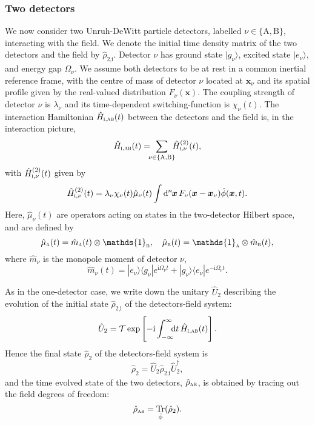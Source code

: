 \documentclass[pra,nofootinbib,floats,aps,twocolumn,tightenlines,superscriptaddress]{revtex4-1}
\DeclareMathOperator{\Tr}{Tr}
\renewcommand*\d[2][]{%
	\mathrm{d}%
	\ifx\relax#1\relax\else
	\rule{-0.02em}{1.5ex}^{#1}\rule{0.08em}{0ex}\!
	\fi
	#2\,
}
\newcommand{\ket}[1]{| {#1} \rangle}
\newcommand{\bra}[1]{\langle {#1} |}
\newcommand{\ii}{\mathrm{i}}
\begin{document}
\subsubsection{Two detectors}

We now consider two Unruh-DeWitt particle detectors, labelled $\nu\in\{\text{A}, \text{B}\}$, interacting with the field. We denote the initial time density matrix of the two detectors and the field by $\hat{\rho}_\text{2,i}$. Detector $\nu$ has ground state $\ket{g_\nu}$, excited state $\ket{e_\nu}$, and energy gap $\Omega_\nu$. We assume both detectors to be at rest in a common inertial reference frame, with the centre of mass of detector $\nu$ located at $\bm{x}_\nu$ and its spatial profile given by the real-valued distribution $F_\nu(\bm x)$. The coupling strength of detector $\nu$ is $\lambda_\nu$ and its time-dependent switching-function is $\chi_\nu(t)$. The interaction Hamiltonian $\hat{H}_\textsc{i,ab} (t)$ between the detectors and the field is, in the interaction picture,
\begin{equation}
\label{eq:H_I_AB}
	\hat{H}_\textsc{i,ab} (t)
	=
	\!\!\!\sum_{\nu\in\{\text{A,B}\}}
	\!\!\!
	\hat{H}_{\textsc{i},\nu}^{(2)}(t),
\end{equation}
with $\hat{H}_{\textsc{i},\nu}^{(2)}(t)$ given by
\begin{equation}
\label{eq:H_I_nu^2}
    \hat{H}_{\textsc{i},\nu}^{(2)}(t)
    =
    \lambda_\nu \chi_\nu(t) \hat{\mu}_\nu(t)
	\int \d[n]{\bm{x}} F_\nu(\bm{x}-\bm{x}_\nu) \hat{\phi}(\bm{x},t).
\end{equation}
Here, $\hat{\mu}_\nu(t)$ are operators acting on states in the two-detector Hilbert space, and are defined by
\begin{equation}
\label{eq:mu_nu}
	\hat{\mu}_\textsc{a}(t)
	=
	\hat{m}_\textsc{a}(t)\otimes\mathds{1}_\textsc{b},\quad 
	\hat{\mu}_\textsc{b}(t)
	=		\mathds{1}_\textsc{a}\otimes\hat{m}_\textsc{b}(t),
\end{equation}
where $\hat{m}_\nu$ is the monopole moment of detector $\nu$,
\begin{equation}
    \label{eq:m_nu}
	\hat{m}_\nu(t)=
	\ket{e_\nu}\bra{g_\nu} e^{\ii\Omega_\nu t}+
	\ket{g_\nu}\bra{e_\nu} e^{-\ii\Omega_\nu t}.
\end{equation}

As in the one-detector case, we write down the unitary $\hat{U}_2$ describing the evolution of the initial state $\hat{\rho}_\text{2,i}$ of the detectors-field system:
\begin{equation}
\label{eq:U2_def}
	\hat{U}_2
	=
	\mathcal{T}\exp\left[{-\ii\int_{-\infty}^{\infty}\!\!\!\dif t\, \hat{H}_\textsc{i,ab}(t)}\right].
\end{equation}
Hence the final state $\hat{\rho}_2$ of the detectors-field system is
\begin{equation}
	\hat{\rho}_2=
	\hat{U}_2 \hat{\rho}_\text{2,i} \hat{U}_2^\dagger,
\end{equation}
and the time evolved state of the two detectors, $\hat{\rho}_\textsc{ab}$, is obtained by tracing out the field degrees of freedom:
\begin{equation}
\label{eq:rho_ab_def}
	\hat{\rho}_\textsc{ab}
	=
	\Tr_{\hat{\phi}}(\hat{\rho}_2).
\end{equation}
\end{document}
